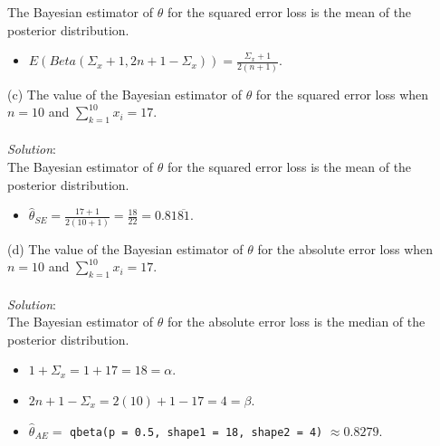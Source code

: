 \documentclass[12pt]{article}
\newcommand{\XBB}{\color{blue}}
\newcommand{\ds}{\displaystyle}
\begin{document}
\noindent
The Bayesian estimator of $ \theta $ for the squared error loss is the mean of the posterior distribution. \\

\begin{itemize}
    \item $ \ds E(Beta(\Sigma_{x} + 1, 2n + 1 - \Sigma_{x})) = \frac{ \Sigma_{x} + 1 }{ 2(n + 1) } $.
\end{itemize}

\newpage

\vspace{2.5mm}

(c) The value of the Bayesian estimator of $ \theta $ for the squared error loss when \\ 
$ n = 10 $ and $ \sum_{k=1}^{10} x_{i} = 17 $. \\
\vspace{2.5mm} \\
\textit{Solution}:
\vspace{2.5mm} \\ 

\noindent
The Bayesian estimator of $ \theta $ for the squared error loss is the mean of the posterior distribution. \\

\begin{itemize}
    \item $ \ds \hat{\theta}_{SE} = \frac{ 17 + 1 }{ 2(10 + 1) } = \frac{ 18 }{ 22 } = 0.81\overline{81} $.
\end{itemize}

\vspace{2.5mm}

(d) The value of the Bayesian estimator of $ \theta $ for the absolute error loss when \\ 
$ n = 10 $ and $ \sum_{k=1}^{10} x_{i} = 17 $. \\
\vspace{2.5mm} \\
\textit{Solution}:
\vspace{2.5mm} \\ 

\noindent
The Bayesian estimator of $ \theta $ for the absolute error loss is the median of the posterior distribution. \\

\begin{itemize}
    \item $ \ds 1 + \Sigma_{x} = 1 + 17 = 18 = \alpha $.
    \item $ \ds 2n + 1 - \Sigma_{x} = 2(10) + 1 - 17 = 4 = \beta $.
    \item $ \ds \hat{\theta}_{AE} = $ {\XBB \texttt{qbeta(p = 0.5, shape1 = 18, shape2 = 4)}} $ \approx 0.8279 $.
\end{itemize}
\end{document}

